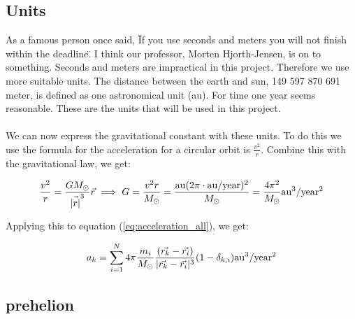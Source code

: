 \subsection{Units}
As a famous person once said, \"If you use seconds and meters you will not finish within the deadline\". I think our professor, Morten Hjorth-Jensen, is on to something. Seconds and meters are impractical in this project. Therefore we use more suitable units. The distance between the earth and sun, 149 597 870 691 meter, is defined as one astronomical unit (au). For time one year seems reasonable. 
These are the units that will be used in this project. 
\\
\\
We can now express the gravitational constant with these units. To do this we use the formula for the acceleration for a circular orbit is $\frac{v^2}{r}$. Combine this with the gravitational law, we get: 

\begin{align*}
	\frac{v^2}{r} =
	\frac{GM_{\odot}}{\vec{|r|}^3}\vec{r} 
	\implies 
	G
	=
	\frac{v^2 r}{M_{\odot}} = \frac{\rm{au} (2\pi \cdot \rm{au/year})^2}{M_{\odot}}
	=
	\frac{4\pi^2}
	{M_{\odot}} \rm{au^3/year^2}
\end{align*}

Applying this to equation (\ref{eq:acceleration_all}), we get: 

\begin{align}
	a_k
	=
	\sum_{i = 1}^{N}
	4 \pi \frac{m_i}{M_{\odot}}
	\frac{(\vec{r_k} - \vec{r_i})}
	{|\vec{r_k} - \vec{r_i}|^3}
	(1 - \delta_{k,i}) \rm{au^3/year^2}
	\label{eq:acceleration_all_au}
\end{align}














\subsection{prehelion}



















